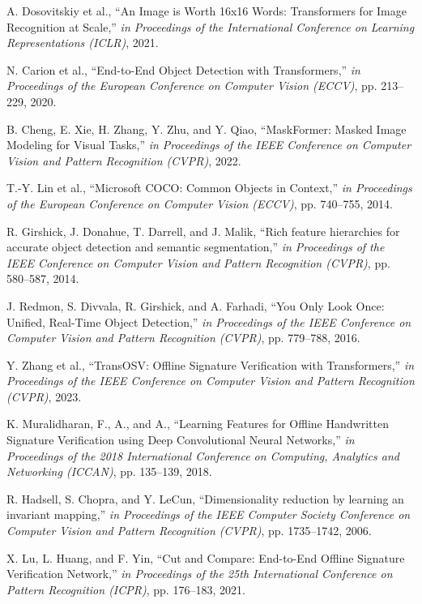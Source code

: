 \documentclass{article}
\begin{document}
\begin{thebibliography}{10}
	A. Dosovitskiy et al.,
	``An Image is Worth 16x16 Words: Transformers for Image Recognition at Scale,''
	\emph{in Proceedings of the International Conference on Learning Representations (ICLR)},
	2021.

	N. Carion et al.,
	``End-to-End Object Detection with Transformers,''
	\emph{in Proceedings of the European Conference on Computer Vision (ECCV)},
	pp. 213--229, 2020.

	B. Cheng, E. Xie, H. Zhang, Y. Zhu, and Y. Qiao,
	``MaskFormer: Masked Image Modeling for Visual Tasks,''
	\emph{in Proceedings of the IEEE Conference on Computer Vision and Pattern Recognition (CVPR)},
	2022.

	T.-Y. Lin et al.,
	``Microsoft COCO: Common Objects in Context,''
	\emph{in Proceedings of the European Conference on Computer Vision (ECCV)},
	pp. 740--755, 2014.

	R. Girshick, J. Donahue, T. Darrell, and J. Malik,
	``Rich feature hierarchies for accurate object detection and semantic segmentation,''
	\emph{in Proceedings of the IEEE Conference on Computer Vision and Pattern Recognition (CVPR)},
	pp. 580--587, 2014.

	J. Redmon, S. Divvala, R. Girshick, and A. Farhadi,
	``You Only Look Once: Unified, Real-Time Object Detection,''
	\emph{in Proceedings of the IEEE Conference on Computer Vision and Pattern Recognition (CVPR)},
	pp. 779--788, 2016.

	Y. Zhang et al.,
	``TransOSV: Offline Signature Verification with Transformers,''
	\emph{in Proceedings of the IEEE Conference on Computer Vision and Pattern Recognition (CVPR)},
	2023.

	K. Muralidharan, F., A., and A.,
	``Learning Features for Offline Handwritten Signature Verification using Deep Convolutional Neural Networks,''
	\emph{in Proceedings of the 2018 International Conference on Computing, Analytics and Networking (ICCAN)},
	pp. 135--139, 2018.

	R. Hadsell, S. Chopra, and Y. LeCun,
	``Dimensionality reduction by learning an invariant mapping,''
	\emph{in Proceedings of the IEEE Computer Society Conference on Computer Vision and Pattern Recognition (CVPR)},
	pp. 1735--1742, 2006.

	X. Lu, L. Huang, and F. Yin,
	``Cut and Compare: End-to-End Offline Signature Verification Network,''
	\emph{in Proceedings of the 25th International Conference on Pattern Recognition (ICPR)},
	pp. 176--183, 2021.


\end{thebibliography}
\end{document}
